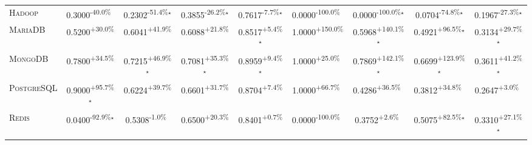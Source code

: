 \begin{table}[htbp]
\begin{tabular}{l|cccc|cccc}
\textsc{Hadoop} & \cellcolor{red!30}0.3000\textsuperscript{-40.0\%}$^{\,\,\,}$ & \cellcolor{red!30}0.2302\textsuperscript{-51.4\%}$^\star$ & \cellcolor{red!30}0.3855\textsuperscript{-26.2\%}$^\star$ & \cellcolor{red!30}0.7617\textsuperscript{-7.7\%}$^\star$ & \cellcolor{red!30}0.0000\textsuperscript{-100.0\%}$^{\,\,\,}$ & \cellcolor{red!30}0.0000\textsuperscript{-100.0\%}$^\star$ & \cellcolor{red!30}0.0704\textsuperscript{-74.8\%}$^\star$ & \cellcolor{red!30}0.1967\textsuperscript{-27.3\%}$^\star$ \\
\textsc{MariaDB} & \cellcolor{green!30}0.5200\textsuperscript{+30.0\%}$^{\,\,\,}$ & \cellcolor{green!30}0.6041\textsuperscript{+41.9\%}$^{\,\,\,}$ & \cellcolor{green!30}0.6088\textsuperscript{+21.8\%}$^{\,\,\,}$ & \cellcolor{green!30}0.8517\textsuperscript{+5.4\%}$^\star$ & \cellcolor{green!30}1.0000\textsuperscript{+150.0\%}$^{\,\,\,}$ & \cellcolor{green!30}0.5968\textsuperscript{+140.1\%}$^\star$ & \cellcolor{green!30}0.4921\textsuperscript{+96.5\%}$^\star$ & \cellcolor{green!30}0.3134\textsuperscript{+29.7\%}$^\star$ \\
\textsc{MongoDB} & \cellcolor{green!30}0.7800\textsuperscript{+34.5\%}$^{\,\,\,}$ & \cellcolor{green!30}0.7215\textsuperscript{+46.9\%}$^\star$ & \cellcolor{green!30}0.7081\textsuperscript{+35.3\%}$^\star$ & \cellcolor{green!30}0.8959\textsuperscript{+9.4\%}$^\star$ & \cellcolor{green!30}1.0000\textsuperscript{+25.0\%}$^{\,\,\,}$ & \cellcolor{green!30}0.7869\textsuperscript{+142.1\%}$^\star$ & \cellcolor{green!30}0.6699\textsuperscript{+123.9\%}$^\star$ & \cellcolor{green!30}0.3611\textsuperscript{+41.2\%}$^\star$ \\
\textsc{PostgreSQL} & \cellcolor{green!30}0.9000\textsuperscript{+95.7\%}$^\star$ & \cellcolor{green!30}0.6224\textsuperscript{+39.7\%}$^{\,\,\,}$ & \cellcolor{green!30}0.6601\textsuperscript{+31.7\%}$^{\,\,\,}$ & \cellcolor{green!30}0.8704\textsuperscript{+7.4\%}$^{\,\,\,}$ & \cellcolor{green!30}1.0000\textsuperscript{+66.7\%}$^{\,\,\,}$ & \cellcolor{green!30}0.4286\textsuperscript{+36.5\%}$^{\,\,\,}$ & \cellcolor{green!30}0.3812\textsuperscript{+34.8\%}$^{\,\,\,}$ & \cellcolor{green!30}0.2647\textsuperscript{+3.0\%}$^{\,\,\,}$ \\
\textsc{Redis} & \cellcolor{red!30}0.0400\textsuperscript{-92.9\%}$^\star$ & \cellcolor{red!30}0.5308\textsuperscript{-1.0\%}$^{\,\,\,}$ & \cellcolor{green!30}0.6500\textsuperscript{+20.3\%}$^{\,\,\,}$ & \cellcolor{green!30}0.8401\textsuperscript{+0.7\%}$^{\,\,\,}$ & \cellcolor{red!30}0.0000\textsuperscript{-100.0\%}$^{\,\,\,}$ & \cellcolor{green!30}0.3752\textsuperscript{+2.6\%}$^{\,\,\,}$ & \cellcolor{green!30}0.5075\textsuperscript{+82.5\%}$^\star$ & \cellcolor{green!30}0.3310\textsuperscript{+27.1\%}$^\star$ \\

\end{tabular}
\end{table}
